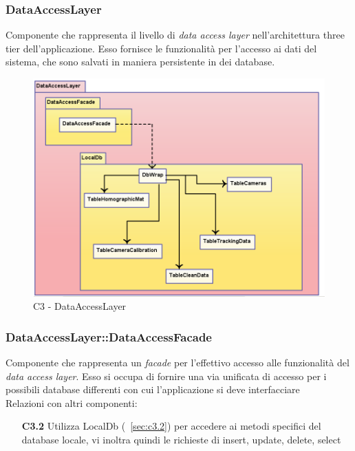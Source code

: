 \subsubsection{DataAccessLayer} \label{sec:c3}
Componente che rappresenta il livello di \textit{data access layer} nell'architettura three tier dell'applicazione. Esso fornisce le funzionalità per l'accesso ai dati del sistema, che sono salvati in maniera persistente in dei database. 
\\
\begin{figure}[!h] 

        \centering 

        \includegraphics[scale=0.4]{./images/c3.png} 

        \caption{C3 - DataAccessLayer} 

        \label{fig:c3}

        \end{figure} 

\subsubsection{DataAccessLayer::DataAccessFacade} \label{sec:c3.1}
Componente che rappresenta un \textit{facade} per l'effettivo accesso alle funzionalità del \textit{data access layer}. Esso si occupa di fornire una via unificata di accesso per i possibili database differenti con cui l'applicazione si deve interfacciare\\
Relazioni con altri componenti: 
\begin{itemize} 
\item [\textbf{C3.2}]
Utilizza LocalDb (~\ref{sec:c3.2}) per accedere ai metodi specifici del database locale, vi inoltra quindi le richieste di insert, update, delete, select 
\end{itemize} 

